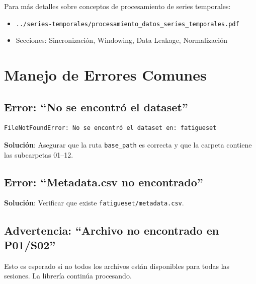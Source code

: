 \documentclass[12pt,a4paper]{article}
\begin{document}
Para más detalles sobre conceptos de procesamiento de series temporales:

\begin{itemize}
    \item \texttt{../series-temporales/procesamiento\_datos\_series\_temporales.pdf}
    \item Secciones: Sincronización, Windowing, Data Leakage, Normalización
\end{itemize}

\appendix

\section{Manejo de Errores Comunes}

\subsection{Error: ``No se encontró el dataset''}

\begin{lstlisting}
FileNotFoundError: No se encontró el dataset en: fatigueset
\end{lstlisting}

\textbf{Solución}: Asegurar que la ruta \texttt{base\_path} es correcta y que la carpeta contiene las subcarpetas 01--12.

\subsection{Error: ``Metadata.csv no encontrado''}

\textbf{Solución}: Verificar que existe \texttt{fatigueset/metadata.csv}.

\subsection{Advertencia: ``Archivo no encontrado en P01/S02''}

Esto es esperado si no todos los archivos están disponibles para todas las sesiones. La librería continúa procesando.
\end{document}
